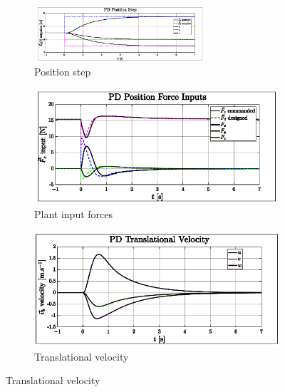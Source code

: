 \begin{figure}[htbp]
\vspace{-10pt}
\centering
\begin{subfigure}{\textwidth}
\centering
\includegraphics[width=0.7\textwidth]{graphs/PD_Position_Step}
\vspace{-6pt}
\caption{Position step}
\label{fig:PD_Position_Step}
\end{subfigure}
\begin{subfigure}{0.49\textwidth}
\centering
\includegraphics[width=\textwidth]{graphs/PD_Position_Force}
\vspace{-20pt}
\caption{Plant input forces}
\label{fig:PD_Position_Force}
\end{subfigure}
\begin{subfigure}{0.49\textwidth}
\centering
\includegraphics[width=\textwidth]{graphs/PD_Position_Velocity}
\vspace{-20pt}
\caption{Translational velocity}
\label{fig:PD_Position_Velocity}
\end{subfigure}

\end{figure}
